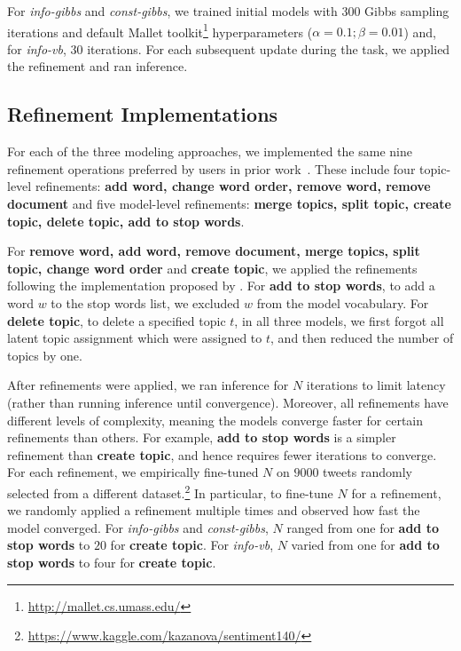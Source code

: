 For \textit{info-gibbs} and \textit{const-gibbs}, we trained initial \lda{}
models with $300$ Gibbs sampling iterations and default Mallet toolkit\footnote{\url{http://mallet.cs.umass.edu/}} hyperparameters ($\alpha=0.1; \beta=0.01$)
and, for \textit{info-vb}, $30$  iterations.
For each subsequent update during the task, we applied the refinement
and ran inference.


\subsection{Refinement Implementations}

For each of the three \hltm{} modeling approaches, we implemented the same nine
refinement operations preferred by users in prior
work~\cite{Lee2017TheModels,Musialek2016UsingApproach,Smith2018ClosingSystem}. These include four topic-level refinements: \textbf{add word, change word order, remove word, remove document} and five model-level refinements: \textbf{merge topics, split topic, create topic, delete topic, add to stop words}. 

For \textbf{remove word, add word, remove document, merge topics, split
  topic, change word order} and \textbf{create topic}, we
applied the refinements following the implementation proposed by
.
For \textbf{add to stop words}, to add a word $w$ to the stop words list, we excluded $w$ from
the model vocabulary. For \textbf{delete topic}, to delete a specified topic $t$, in all three
models, we first forgot all latent topic assignment which were
assigned to $t$, and then reduced the number of topics by one.

After refinements were applied, we ran inference for $N$ iterations to
limit latency (rather than running inference until convergence).
Moreover, all refinements have different levels of complexity, meaning
the models converge faster for certain refinements than others.  For
example, \textbf{add to stop words} is a simpler refinement than
\textbf{create topic}, and hence requires fewer iterations to
converge.  For each refinement, we empirically fine-tuned $N$ on
$9000$ tweets randomly selected from a different
dataset.\footnote{\url{https://www.kaggle.com/kazanova/sentiment140/}}
In particular, to fine-tune $N$ for a refinement, we randomly applied
a refinement multiple times and observed how fast the model converged.
For \textit{info-gibbs} and \textit{const-gibbs}, $N$ ranged from one
for \textbf{add to stop words} to $20$ for \textbf{create topic}. For
\textit{info-vb}, $N$ varied from one for \textbf{add to stop words}
to four for \textbf{create topic}.

